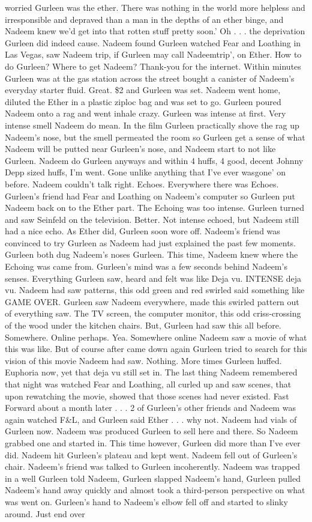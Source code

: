 \documentclass[12pt]{book}
\begin{document}
worried Gurleen was the ether. There was nothing in the world more helpless and irresponsible and depraved than a man in the depths of an ether binge, and Nadeem knew we'd get into that rotten stuff pretty soon.' Oh . . .  the deprivation Gurleen did indeed cause. Nadeem found Gurleen watched Fear and Loathing in Las Vegas, saw Nadeem trip, if Gurleen may call Nadeemtrip', on Ether. How to do Gurleen? Where to get Nadeem? Thank-you for the internet. Within minutes Gurleen was at the gas station across the street bought a canister of Nadeem's everyday starter fluid. Great. \$2 and Gurleen was set. Nadeem went home, diluted the Ether in a plastic ziploc bag and was set to go. Gurleen poured Nadeem onto a rag and went inhale crazy. Gurleen was intense at first. Very intense smell Nadeem do mean. In the film Gurleen practically shove the rag up Nadeem's nose, but the smell permeated the room so Gurleen get a sense of what Nadeem will be putted near Gurleen's nose, and Nadeem start to not like Gurleen. Nadeem do Gurleen anyways and within 4 huffs, 4 good, decent Johnny Depp sized huffs, I'm went. Gone unlike anything that I've ever wasgone' on before. Nadeem couldn't talk right. Echoes. Everywhere there was Echoes. Gurleen's friend had Fear and Loathing on Nadeem's computer so Gurleen put Nadeem back on to the Ether part. The Echoing was too intense. Gurleen turned and saw Seinfeld on the television. Better. Not intense echoed, but Nadeem still had a nice echo. As Ether did, Gurleen soon wore off. Nadeem's friend was convinced to try Gurleen as Nadeem had just explained the past few moments. Gurleen both dug Nadeem's noses Gurleen. This time, Nadeem knew where the Echoing was came from. Gurleen's mind was a few seconds behind Nadeem's senses. Everything Gurleen saw, heard and felt was like Deja vu. INTENSE deja vu. Nadeem had saw patterns, this odd green and red swirled said something like GAME OVER. Gurleen saw Nadeem everywhere, made this swirled pattern out of everything saw. The TV screen, the computer monitor, this odd criss-crossing of the wood under the kitchen chairs. But, Gurleen had saw this all before. Somewhere. Online perhaps. Yea. Somewhere online Nadeem saw a movie of what this was like. But of course after came down again Gurleen tried to search for this vision of this movie Nadeem had saw. Nothing. More times Gurleen huffed. Euphoria now, yet that deja vu still set in. The last thing Nadeem remembered that night was watched Fear and Loathing, all curled up and saw scenes, that upon rewatching the movie, showed that those scenes had never existed. Fast Forward about a month later . . .  2 of Gurleen's other friends and Nadeem was again watched F\&L, and Gurleen said Ether . . .  why not. Nadeem had vials of Gurleen now. Nadeem was produced Gurleen to sell here and there. So Nadeem grabbed one and started in. This time however, Gurleen did more than I've ever did. Nadeem hit Gurleen's plateau and kept went. Nadeem fell out of Gurleen's chair. Nadeem's friend was talked to Gurleen incoherently. Nadeem was trapped in a well Gurleen told Nadeem, Gurleen slapped Nadeem's hand, Gurleen pulled Nadeem's hand away quickly and almost took a third-person perspective on what was went on. Gurleen's hand to Nadeem's elbow fell off and started to slinky around. Just end over 
\end{document}
